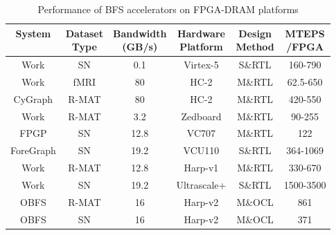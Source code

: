 \begin{table}
  \footnotesize
  \caption{Performance of BFS accelerators on FPGA-DRAM platforms}
  \label{tab:compare}
    \setlength{\tabcolsep}{4pt} %
  \begin{tabular}{cccccc}
    \toprule
	System & \shortstack[c]{Dataset \\ Type} & \shortstack[c]{Bandwidth\\ (GB/s)} & \shortstack[c]{Hardware\\ Platform} & \shortstack[c]{Design\\ Method} & \shortstack[c]{MTEPS\\ /FPGA}\\
    \midrule
	Work\cite{wang2010message} & SN & 0.1 & Virtex-5 & S\&RTL & 160-790 \\
	Work\cite{betkaoui2012reconfigurable} & fMRI & 80 & HC-2 & M\&RTL & 62.5-650 \\
	CyGraph\cite{attia2014cygraph} & R-MAT & 80 & HC-2 & M\&RTL & 420-550 \\
	Work\cite{umuroglu2015hybrid} & R-MAT & 3.2 & Zedboard & M\&RTL & 90-255 \\
	FPGP\cite{dai2016fpgp} & SN & 12.8 & VC707 & M\&RTL & 122 \\
	ForeGraph\cite{Dai2017foregraph} & SN &19.2 & VCU110 & S\&RTL & 364-1069 \\
	Work\cite{zhou2017accelerating} & R-MAT & 12.8 & Harp-v1 & M\&RTL & 330-670 \\
	Work\cite{yao2018efficient} & SN & 19.2 & Ultrascale+ & S\&RTL & 1500-3500 \\
	\midrule
	OBFS & R-MAT & 16 & Harp-v2 & M\&OCL &  861 \\
	OBFS & SN & 16 & Harp-v2 & M\&OCL & 371 \\
  \bottomrule
\end{tabular}
\vspace{-1em}
\end{table}

